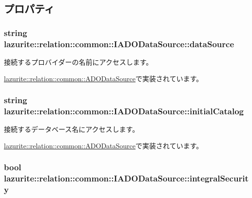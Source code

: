 \subsection{プロパティ}
\hypertarget{interfacelazurite_1_1relation_1_1common_1_1_i_a_d_o_data_source_abb1ba827134336f1622cd05376bfa797}{
\subsubsection[{dataSource}]{\setlength{\rightskip}{0pt plus 5cm}string lazurite::relation::common::IADODataSource::dataSource}}
\label{interfacelazurite_1_1relation_1_1common_1_1_i_a_d_o_data_source_abb1ba827134336f1622cd05376bfa797}


接続するプロバイダーの名前にアクセスします。 

\hyperlink{classlazurite_1_1relation_1_1common_1_1_a_d_o_data_source_a69dab29118f44b9d13e20f478c6858a3}{lazurite::relation::common::ADODataSource}で実装されています。\hypertarget{interfacelazurite_1_1relation_1_1common_1_1_i_a_d_o_data_source_a27a84f2fbf21b934ded2597f5c99e30c}{
\subsubsection[{initialCatalog}]{\setlength{\rightskip}{0pt plus 5cm}string lazurite::relation::common::IADODataSource::initialCatalog}}
\label{interfacelazurite_1_1relation_1_1common_1_1_i_a_d_o_data_source_a27a84f2fbf21b934ded2597f5c99e30c}


接続するデータベース名にアクセスします。 

\hyperlink{classlazurite_1_1relation_1_1common_1_1_a_d_o_data_source_a1f193a5ed7eb84c41dc0d746ec8abade}{lazurite::relation::common::ADODataSource}で実装されています。\hypertarget{interfacelazurite_1_1relation_1_1common_1_1_i_a_d_o_data_source_a6bbdd4ce8e7e7c36be1af7a17e382b04}{
\subsubsection[{integralSecurity}]{\setlength{\rightskip}{0pt plus 5cm}bool lazurite::relation::common::IADODataSource::integralSecurity}}
\label{interfacelazurite_1_1relation_1_1common_1_1_i_a_d_o_data_source_a6bbdd4ce8e7e7c36be1af7a17e382b04}


